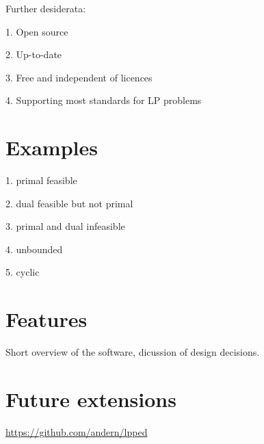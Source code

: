 \documentclass[ukenglish]{nik}
\begin{document}
Further desiderata:

1. Open source

2. Up-to-date

3. Free and independent of licences

4. Supporting most standards for LP problems

\section{Examples}
1. primal feasible

2. dual feasible but not primal

3. primal and dual infeasible

4. unbounded

5. cyclic

\section{Features}
Short overview of the software, dicussion of design decisions.

\section{Future extensions}





\begin{thebibliography}{99}
\url{https://github.com/andern/lpped}
\end{thebibliography}
\end{document}
